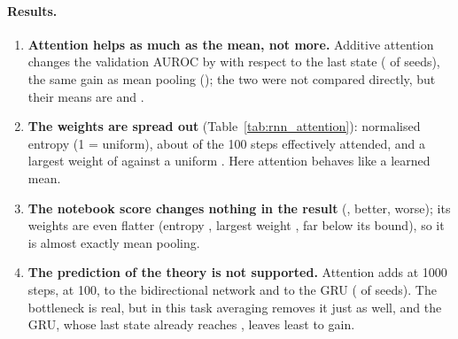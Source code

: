 \paragraph{Results.}
\begin{enumerate}[leftmargin=1.4em,itemsep=2pt]
  \item \textbf{Attention helps as much as the mean, not more.} Additive attention changes the validation
        AUROC by \rnnDiffMeanAttn{} with respect to the last state (\rnnNSeedsBetterAttn{} of
        \rnnNSeedsComparedAttn{} seeds), the same gain as mean pooling (\rnnDiffMeanMean{}); the two
        were not compared directly, but their means are \rnnValAurocMeanAttn{} and
        \rnnValAurocMeanMean{}.
  \item \textbf{The weights are spread out} (Table~\ref{tab:rnn_attention}): normalised entropy
        \rnnAttnEntropyNormAttn{} (1 = uniform), about \intval{\rnnAttnEffectiveStepsAttn} of the 100
        steps effectively attended, and a largest weight of \rnnAttnMaxWeightAttn{} against a uniform
        \rnnAttnUniformAttn{}. Here attention behaves like a learned mean.
  \item \textbf{The notebook score changes nothing in the result} (\rnnDiffMeanAttnTanh{},
        \rnnNSeedsBetterAttnTanh{} better, \rnnNSeedsWorseAttnTanh{} worse); its weights are even flatter
        (entropy \rnnAttnEntropyNormAttnTanh{}, largest weight \rnnAttnMaxWeightAttnTanh{}, far below its
        bound), so it is almost exactly mean pooling.
  \item \textbf{The prediction of the theory is not supported.} Attention adds \rnnDiffMeanRawAttn{} at
        1000 steps, \rnnDiffMeanAttn{} at 100, \rnnDiffMeanBiAttn{} to the bidirectional network and
        \rnnDiffMeanGruAttn{} to the GRU (\rnnNSeedsBetterGruAttn{} of \rnnNSeedsComparedGruAttn{} seeds).
        The bottleneck is real, but in this task averaging removes it just as well, and the GRU, whose last
        state already reaches \rnnValAurocMeanGru{}, leaves least to gain.
\end{enumerate}





